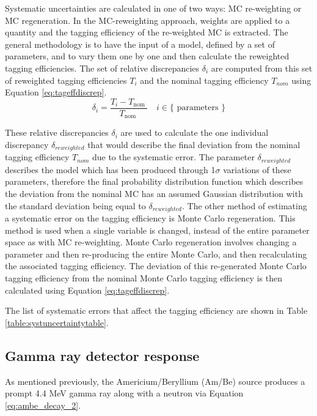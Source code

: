 Systematic uncertainties are calculated in one of two ways: MC re-weighting or MC regeneration. In the MC-reweighting approach, weights are applied to a quantity and the tagging efficiency of the re-weighted MC is extracted. The general methodology is to have the input of a model, defined by a set of parameters, and to vary them one by one and then calculate the reweighted tagging efficiencies. The set of relative discrepancies $\delta_{i}$ are computed from this set of reweighted tagging efficiencies $T_{i}$ and the nominal tagging efficiency $T_{nom}$ using Equation \ref{eq:tageffdiscrep}.
\newline
\begin{equation}
    \delta_{i}=\frac{T_{i}-T_{\text {nom }}}{T_{\text {nom }}} \quad i \in\{\text { parameters }\}
\label{eq:tageffdiscrep}
\end{equation}
\newline

These relative discrepancies $\delta_{i}$ are used to calculate the one individual discrepancy $\delta_{reweighted}$ that would describe the final deviation from the nominal tagging efficiency $T_{nom}$ due to the systematic error. The parameter $\delta_{reweighted}$ describes the model which has been produced through 1$\sigma$ variations of these parameters, therefore the final probability distribution function which describes the deviation from the nominal MC has an assumed Gaussian distribution with the standard deviation being equal to $\delta_{reweighted}$. 
\newline
The other method of estimating a systematic error on the tagging efficiency is Monte Carlo regeneration. This method is used when a single variable is changed, instead of the entire parameter space as with MC re-weighting. Monte Carlo regeneration involves changing a parameter and then re-producing the entire Monte Carlo, and then recalculating the associated tagging efficiency. The deviation of this re-generated Monte Carlo tagging efficiency from the nominal Monte Carlo tagging efficiency is then calculated using Equation \ref{eq:tageffdiscrep}.


The list of systematic errors that affect the tagging efficiency are shown in Table \ref{table:systuncertaintytable}. 

\subsection{Gamma ray detector response}

As mentioned previously, the Americium/Beryllium (Am/Be) source produces a prompt 4.4 MeV gamma ray along with a neutron via Equation \ref{eq:ambe_decay_2}. 

